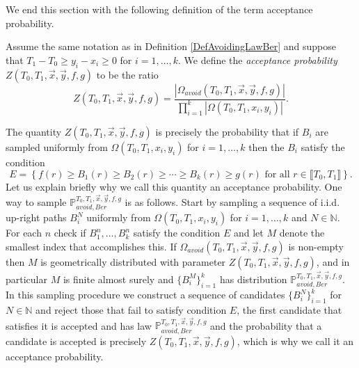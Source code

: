 We end this section with the following definition of the term acceptance probability. 
\begin{definition}\label{DefAP} Assume the same notation as in Definition \ref{DefAvoidingLawBer} and suppose that $ T_1 - T_0 \geq y_i -x_i \geq 0$ for $i =1, \dots, k$. We define the {\em acceptance probability } $Z(  T_0, T_1, \vec{x}, \vec{y}, f, g)$ to be the ratio
\begin{equation}\label{EqAP}
Z(  T_0, T_1, \vec{x}, \vec{y}, f, g) = \frac{|\Omega_{avoid}(T_0, T_1, \vec{x}, \vec{y}, f,g)|}{\prod_{i = 1}^k |\Omega(T_0, T_1, x_i, y_i)|}.
\end{equation}
\end{definition}
\begin{remark}\label{RemAP} The quantity $Z(  T_0, T_1, \vec{x}, \vec{y}, f, g)$ is precisely the probability that if $B_i$ are sampled uniformly from $\Omega(T_0, T_1, x_i, y_i)$ for $i =1 , \dots, k$ then the $B_i$ satisfy the condition
$$ E=  \left\{ f(r) \geq B_1(r) \geq B_2(r) \geq \cdots \geq B_k(r) \geq g(r) \mbox{ for all $r \in \llbracket T_0, T_1 \rrbracket$} \right\}.$$
 Let us explain briefly why we call this quantity an acceptance probability. One way to sample $\mathbb{P}_{avoid, Ber}^{T_0,T_1, \vec{x}, \vec{y}, f, g}$ is as follows. Start by sampling a sequence of i.i.d. up-right paths $B^N_i$ uniformly from $\Omega(T_0, T_1, x_i, y_i)$ for $i =1 , \dots, k$ and $N \in \mathbb{N}$. For each $n$ check if $B^n_1, \dots, B^n_k$ satisfy the condition $E$ and let $M$ denote the smallest index that accomplishes this. If $\Omega_{avoid}(T_0, T_1, \vec{x}, \vec{y}, f,g)$ is non-empty then $M$ is geometrically distributed with parameter $Z(  T_0, T_1, \vec{x}, \vec{y}, f, g)$, and in particular $M$ is finite almost surely and $\{B^M_i\}_{i =1}^k$ has distribution $\mathbb{P}_{avoid, Ber}^{T_0,T_1, \vec{x}, \vec{y}, f, g}$. In this sampling procedure we construct a sequence of candidates $\{B^N_i\}_{i =1}^k$ for $N \in \mathbb{N}$ and reject those that fail to satisfy condition $E$, the first candidate that satisfies it is accepted and has law $\mathbb{P}_{avoid, Ber}^{T_0,T_1, \vec{x}, \vec{y}, f, g}$ and the probability that a candidate is accepted is precisely $Z(  T_0, T_1, \vec{x}, \vec{y}, f, g)$, which is why we call it an acceptance probability.
\end{remark}



%
